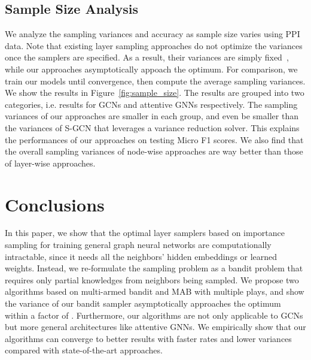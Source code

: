 \documentclass{article}
\begin{document}
\subsection{Sample Size Analysis}
We analyze the sampling variances and accuracy
as sample size varies using PPI data.
Note that existing layer sampling approaches do not
optimize the variances once the 
samplers are specified. As a result, their
variances are simply fixed~\cite{zou2019layer}, while
our approaches asymptotically appoach the optimum.
For comparison, we train our models until convergence,
then compute the average sampling variances. 
We show the results in Figure~\ref{fig:sample_size}.
The results are grouped into two categories, i.e.
results for GCNs and attentive GNNs respectively.
The sampling variances of our approaches are smaller 
in each group, and even be smaller than the 
variances of S-GCN that leverages a variance reduction solver. 
This explains the
performances of our approaches on testing Micro F1 scores.
We also find that the overall sampling variances of node-wise
approaches are way better than those of layer-wise
approaches.



\section{Conclusions}
In this paper, we show that the optimal layer samplers
based on importance sampling for training general 
graph neural networks are computationally intractable,
since it needs all the neighbors' hidden embeddings 
or learned weights.
Instead, we re-formulate the sampling problem as a bandit problem
that requires only partial knowledges from neighbors being sampled.
We propose two algorithms based on multi-armed bandit and MAB with
multiple plays, and show the variance of our bandit sampler 
asymptotically approaches the optimum within a factor of .
Furthermore, our algorithms are not only applicable to 
GCNs but more general architectures like attentive GNNs.
We empirically show that our algorithms can converge to 
better results with faster rates and lower variances
compared with state-of-the-art approaches.
\end{document}
